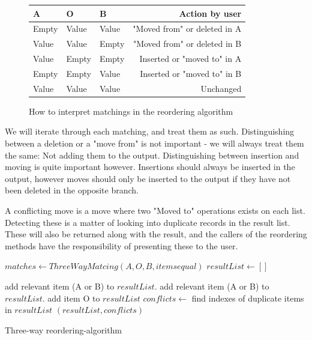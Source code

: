 \documentclass[11pt]{article}
\begin{document}
\begin{figure}
\centering
\begin{tabular}{ | l | l | l || r |}
  \hline                        
   \textbf{A} & \textbf{O} & \textbf{B} & \textbf{Action by user} \\
  \hline                        
  Empty & Value & Value & "Moved from" or deleted in A \\
  Value & Value & Empty & "Moved from" or deleted in B \\
  Value & Empty & Empty & Inserted or "moved to" in A \\
  Empty & Empty & Value & Inserted or "moved to" in B \\
  Value & Value & Value & Unchanged \\
  \hline  
\end{tabular}
  \caption{How to interpret matchings in the reordering algorithm}
\label{ReorderingTable}
\end{figure}

We will iterate through each matching, and treat them as such. Distinguishing between a deletion or a "move from" is not important - we will always treat them the same: Not adding them to the output. Distinguishing between insertion and moving is quite important however. Insertions should always be inserted in the output, however moves should only be inserted to the output if they have not been deleted in the opposite branch. 

A conflicting move is a move where two "Moved to" operations exists on each list. Detecting these is a matter of looking into duplicate records in the result list. These will also be returned along with the result, and the callers of the reordering methods have the responsibility of presenting these to the user.

\begin{algorithm}
\begin{algorithmic}
   \State $matches \gets ThreeWayMatcing(A, O, B, items equal)$
   \State $resultList \gets []$
   
         \State add relevant item (A or B) to $resultList$.
      \EndIf
         \State add relevant item (A or B) to $resultList$.
      \EndIf
         \State add item O to $resultList$
      \EndIf
	\EndFor
	\State $conflicts \gets$ find indexes of duplicate items in $resultList$
	\State \Return $(resultList, conflicts)$
\EndFunction
\end{algorithmic}
\caption{Three-way reordering-algorithm}
  \label{ThreeWayReorderingAlgorithm}
\end{algorithm}
\end{document}

